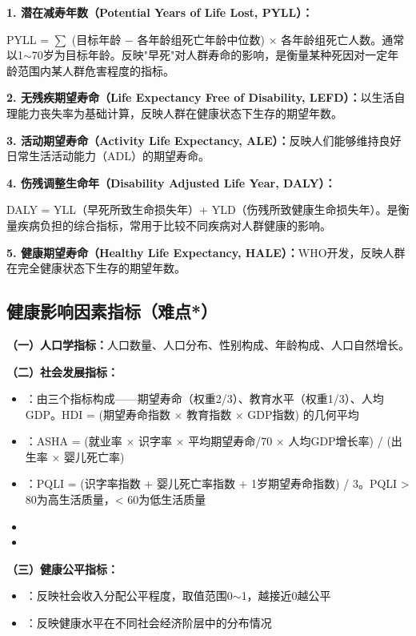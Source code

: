 \begin{keybox}
\textbf{1. 潜在减寿年数（Potential Years of Life Lost, PYLL）：}

PYLL = $\sum$ (目标年龄 $-$ 各年龄组死亡年龄中位数) × 各年龄组死亡人数。通常以1$\sim$70岁为目标年龄。反映"早死"对人群寿命的影响，是衡量某种死因对一定年龄范围内某人群危害程度的指标。

\textbf{2. 无残疾期望寿命（Life Expectancy Free of Disability, LEFD）：}以生活自理能力丧失率为基础计算，反映人群在健康状态下生存的期望年数。

\textbf{3. 活动期望寿命（Activity Life Expectancy, ALE）：}反映人们能够维持良好日常生活活动能力（ADL）的期望寿命。

\textbf{4. 伤残调整生命年（Disability Adjusted Life Year, DALY）：}

DALY = YLL（早死所致生命损失年）+ YLD（伤残所致健康生命损失年）。是衡量疾病负担的综合指标，常用于比较不同疾病对人群健康的影响。

\textbf{5. 健康期望寿命（Healthy Life Expectancy, HALE）：}WHO开发，反映人群在完全健康状态下生存的期望年数。
\end{keybox}

\subsection{健康影响因素指标（难点*）}

\begin{keybox}
\textbf{（一）人口学指标：}人口数量、人口分布、性别构成、年龄构成、人口自然增长。

\textbf{（二）社会发展指标：}

\begin{itemize}[leftmargin=*]
    \item {}：由三个指标构成——期望寿命（权重2/3）、教育水平（权重1/3）、人均GDP。HDI = (期望寿命指数 × 教育指数 × GDP指数) 的几何平均
    \item {}：ASHA = (就业率 × 识字率 × 平均期望寿命/70 × 人均GDP增长率) / (出生率 × 婴儿死亡率)
    \item {}：PQLI = (识字率指数 + 婴儿死亡率指数 + 1岁期望寿命指数) / 3。PQLI > 80为高生活质量，< 60为低生活质量
    \item {}
    \item {}
\end{itemize}

\textbf{（三）健康公平指标：}
\begin{itemize}[leftmargin=*]
    \item {}：反映社会收入分配公平程度，取值范围0$\sim$1，越接近0越公平
    \item {}：反映健康水平在不同社会经济阶层中的分布情况
\end{itemize}
\end{keybox}

